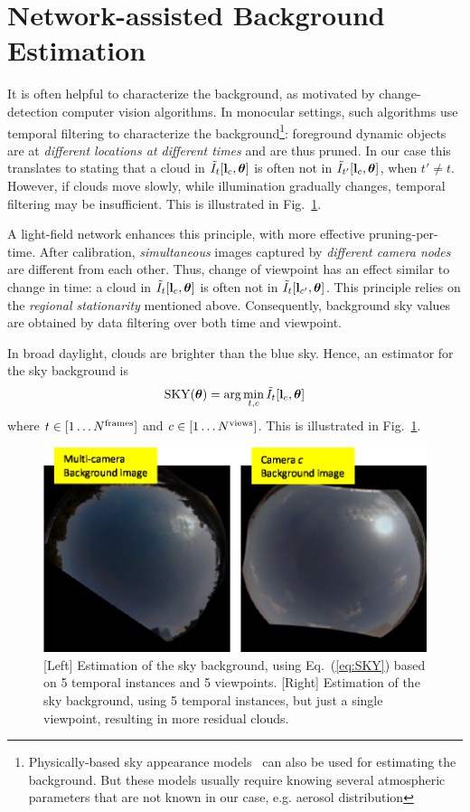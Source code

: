 \documentclass[runningheads]{llncs}
\begin{document}
\section{Network-assisted Background Estimation}
\label{sec:background}

It is often helpful to characterize the background, as motivated by change-detection computer vision algorithms. In monocular settings, such algorithms use temporal filtering to characterize the background\footnote{Physically-based sky appearance models~\cite{hosek2012analytic} can also be used for estimating the background. But these models usually require knowing several atmospheric parameters that are not known in our case, e.g. aerosol distribution}: foreground dynamic objects are at {\em different locations at different times} and are thus pruned. In our case this translates to stating that a cloud in
$\tilde I_t[{\bf l}_c,{\bm \theta}]$ is often not in
$\tilde I_{t'}[{\bf l}_c,{\bm \theta}]$, when $t'\neq t$. However, if clouds move slowly, while illumination gradually changes, temporal filtering may be insufficient. This is illustrated in Fig.~\ref{fig:sky}.

A light-field network enhances this principle, with more effective pruning-per-time. After calibration, {\em simultaneous} images captured by {\em different camera nodes} are different from each other. Thus, change of viewpoint has an effect similar to change in time: a cloud in
$\tilde I_t[{\bf l}_c,{\bm \theta}]$ is often not in $\tilde I_t[{\bf l}_{c'},{\bm \theta}]$. This principle relies on the {\em regional stationarity} mentioned above. Consequently, background sky values are obtained by data filtering over both time and viewpoint.

In broad daylight, clouds are brighter than the blue sky. Hence, an estimator for the sky background is
\begin{equation}
 {\rm SKY}({\bm \theta})= \arg\min_{t,c} \tilde I_t[{\bf l}_c,{\bm \theta}]
 \label{eq:SKY}
\end{equation}
where $t\in[1\ldots N^{\rm frames}]$ and $c\in[1\ldots N^{\rm views}]$.
This is illustrated in Fig.~\ref{fig:sky}.
\begin{figure}[t!]
\begin{center}
   \includegraphics[width=0.5\linewidth]{figures/Background.eps}
\end{center}
   \vspace{-0.6cm}
   \caption{[Left] Estimation of the sky background, using Eq.~(\ref{eq:SKY}) based on 5 temporal
   instances and 5 viewpoints. [Right] Estimation of the sky background, using 5 temporal
   instances, but just a single viewpoint, resulting in more residual clouds.}
\label{fig:sky}
\end{figure}
\end{document}
